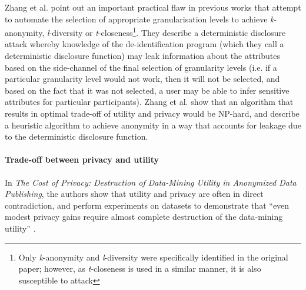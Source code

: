 Zhang et al. \cite{Zhang2007} point out an important practical flaw in previous works that attempt to automate the selection of appropriate granularisation levels to achieve \textit{k}-anonymity, \textit{l}-diversity or \textit{t}-closeness\footnote{Only \textit{k}-anonymity and \textit{l}-diversity were specifically identified in the original paper; however, as \textit{t}-closeness is used in a similar manner, it is also susceptible to attack}. They describe a deterministic disclosure attack whereby knowledge of the de-identification program (which they call a deterministic disclosure function) may leak information about the attributes based on the side-channel of the final selection of granularity levels (i.e. if a particular granularity level would not work, then it will not be selected, and based on the fact that it was not selected, a user may be able to infer sensitive attributes for particular participants). Zhang et al. show that an algorithm that results in optimal trade-off of utility and privacy would be NP-hard, and describe a heuristic algorithm to achieve anonymity in a way that accounts for leakage due to the deterministic disclosure function.





\paragraph{Trade-off between privacy and utility}

In \textit{The Cost of Privacy: Destruction of Data-Mining Utility in Anonymized Data Publishing}, the authors show that utility and privacy are often in direct contradiction, and perform experiments on datasets to demonstrate that ``even modest privacy gains require almost complete destruction of the data-mining utility'' \cite{Brickell2008}.

